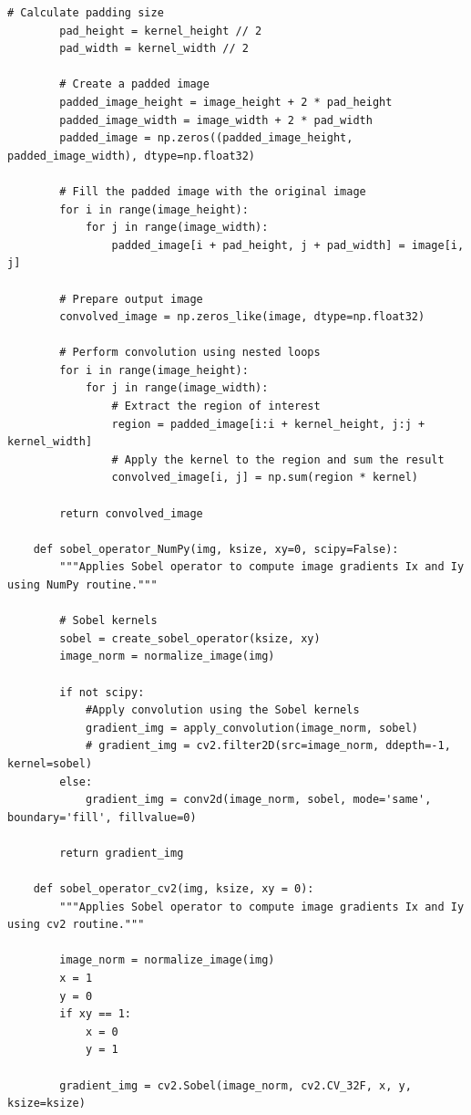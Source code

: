 \documentclass[11pt, conference, letterpaper]{IEEEtran}
\begin{document}
\begin{lstlisting}[style=python, caption={\texttt{image\_utils.py}}, label={lst:iutils}]
        # Calculate padding size
        pad_height = kernel_height // 2
        pad_width = kernel_width // 2
        
        # Create a padded image
        padded_image_height = image_height + 2 * pad_height
        padded_image_width = image_width + 2 * pad_width
        padded_image = np.zeros((padded_image_height, padded_image_width), dtype=np.float32)
    
        # Fill the padded image with the original image
        for i in range(image_height):
            for j in range(image_width):
                padded_image[i + pad_height, j + pad_width] = image[i, j]
    
        # Prepare output image
        convolved_image = np.zeros_like(image, dtype=np.float32)
    
        # Perform convolution using nested loops
        for i in range(image_height):
            for j in range(image_width):
                # Extract the region of interest
                region = padded_image[i:i + kernel_height, j:j + kernel_width]
                # Apply the kernel to the region and sum the result
                convolved_image[i, j] = np.sum(region * kernel)
        
        return convolved_image
    
    def sobel_operator_NumPy(img, ksize, xy=0, scipy=False):
        """Applies Sobel operator to compute image gradients Ix and Iy using NumPy routine."""
        
        # Sobel kernels
        sobel = create_sobel_operator(ksize, xy)
        image_norm = normalize_image(img)
    
        if not scipy:
            #Apply convolution using the Sobel kernels
            gradient_img = apply_convolution(image_norm, sobel)
            # gradient_img = cv2.filter2D(src=image_norm, ddepth=-1, kernel=sobel)
        else:
            gradient_img = conv2d(image_norm, sobel, mode='same', boundary='fill', fillvalue=0)
            
        return gradient_img
    
    def sobel_operator_cv2(img, ksize, xy = 0):
        """Applies Sobel operator to compute image gradients Ix and Iy using cv2 routine."""
        
        image_norm = normalize_image(img)
        x = 1
        y = 0
        if xy == 1:
            x = 0
            y = 1
        
        gradient_img = cv2.Sobel(image_norm, cv2.CV_32F, x, y, ksize=ksize)
        

\end{lstlisting}
\end{document}
